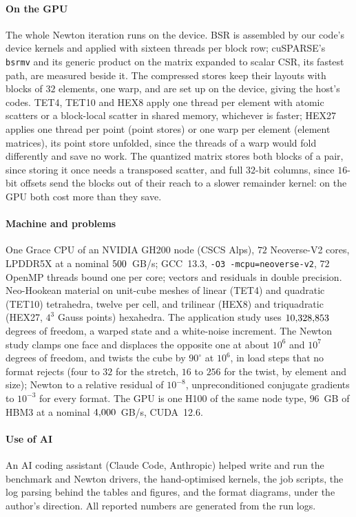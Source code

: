 \documentclass[sigconf,review]{acmart}
\begin{document}
\paragraph{On the GPU}  The whole Newton iteration runs on the device.  BSR is assembled by
our code's device kernels and applied with sixteen threads per block row; cuSPARSE's \texttt{bsrmv}
and its generic product on the matrix expanded to scalar CSR, its fastest path, are measured beside
it.  The compressed stores keep their layouts with blocks of $32$ elements, one
warp, and are set up on the device, giving the host's codes.  TET4, TET10 and HEX8 apply one thread
per element with atomic scatters or a block-local scatter in shared memory, whichever is faster;
HEX27 applies one thread per point (point stores) or one warp per element (element matrices), its
point store unfolded, since the threads of a warp would fold differently and save no work.  The
quantized matrix stores both blocks of a pair, since storing it once needs a transposed scatter, and
full $32$-bit columns, since $16$-bit offsets send the blocks out of their reach to a slower
remainder kernel: on the GPU both cost more than they save.

\paragraph{Machine and problems}  One Grace CPU of an NVIDIA GH200 node (CSCS Alps), $72$
Neoverse-V2 cores, LPDDR5X at a nominal $500$~GB/s; GCC~13.3, \texttt{-O3 -mcpu=neoverse-v2}, $72$ OpenMP threads bound one
per core; vectors and residuals in double precision.  Neo-Hookean material on unit-cube meshes of
linear (TET4) and quadratic (TET10) tetrahedra, twelve per cell, and trilinear (HEX8) and
triquadratic (HEX27, $4^3$ Gauss points) hexahedra.  The application study uses $10{,}328{,}853$
degrees of freedom, a warped state and a white-noise increment.  The Newton study clamps one face
and displaces the opposite one at about $10^6$ and $10^7$ degrees of freedom, and twists the cube by
$90^\circ$ at $10^6$, in load steps that no format rejects (four to $32$ for the stretch, $16$ to
$256$ for the twist, by element and size); Newton to a relative residual of $10^{-8}$,
unpreconditioned conjugate gradients to $10^{-3}$ for every format.
The GPU is one H100 of the same node type, $96$~GB of HBM3 at a nominal $4{,}000$~GB/s,
CUDA~12.6.

\paragraph{Use of AI}  An AI coding assistant (Claude Code, Anthropic) helped write and run the
benchmark and Newton drivers, the hand-optimised kernels, the job scripts, the log parsing behind the
tables and figures, and the format diagrams, under the author's direction.  All reported numbers are
generated from the run logs.
\end{document}
